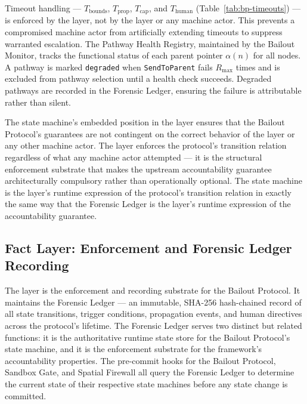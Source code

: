 Timeout handling --- $T_{\text{bounds}}$, $T_{\text{prop}}$,
$T_{\text{cap}}$, and $T_{\text{human}}$ (Table~\ref{tab:bp-timeouts}) --- is
enforced by the \fact{} layer, not by the \bounds{} layer or any machine
actor.  This prevents a compromised machine actor from artificially extending
timeouts to suppress warranted escalation.  The Pathway Health Registry,
maintained by the Bailout Monitor, tracks the functional status of each parent
pointer $\alpha(n)$ for all nodes.  A pathway is marked \texttt{degraded} when
\texttt{SendToParent} fails $R_{\max}$ times and is excluded from pathway
selection until a health check succeeds.  Degraded pathways are recorded in
the Forensic Ledger, ensuring the failure is attributable rather than silent.

The state machine's embedded position in the \fact{} layer ensures that the
Bailout Protocol's guarantees are not contingent on the correct behavior of
the \bounds{} layer or any other machine actor.  The \fact{} layer enforces
the protocol's transition relation regardless of what any machine actor
attempted --- it is the structural enforcement substrate that makes the
upstream accountability guarantee architecturally compulsory rather than
operationally optional.  The state machine is the \fact{} layer's runtime
expression of the protocol's transition relation in exactly the same way
that the Forensic Ledger is the \fact{} layer's runtime expression of the
accountability guarantee.

\subsection{Fact Layer: Enforcement and Forensic Ledger Recording}
\label{sec:bailout-fact-layer}

The \fact{} layer is the enforcement and recording substrate for the Bailout
Protocol.  It maintains the Forensic Ledger --- an immutable, SHA-256
hash-chained record of all state transitions, trigger conditions, propagation
events, and human directives across the protocol's lifetime.  The Forensic
Ledger serves two distinct but related functions: it is the authoritative
runtime state store for the Bailout Protocol's state machine, and it is the
enforcement substrate for the framework's accountability properties.  The
pre-commit hooks for the Bailout Protocol, Sandbox Gate, and Spatial Firewall
all query the Forensic Ledger to determine the current state of their
respective state machines before any state change is committed.

